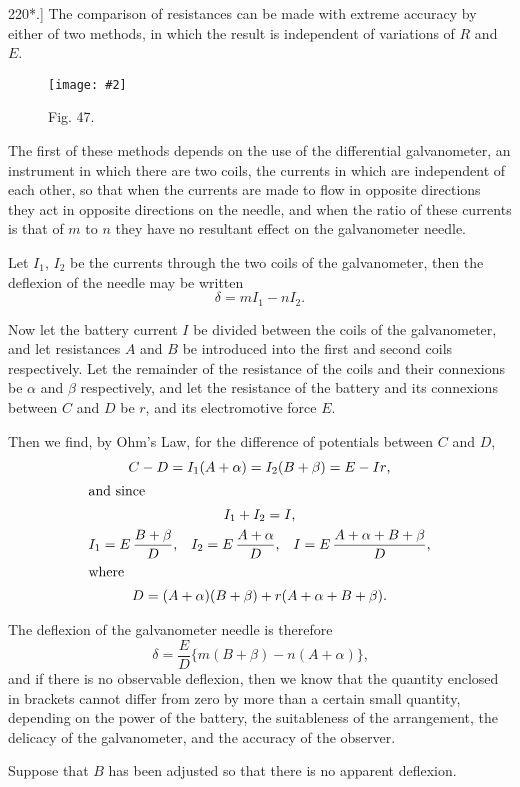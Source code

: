 \documentclass[12pt,oneside]{book}[2021/10/04]
\newcommand{\article}[1]{\phantomsection \label{art:#1}{#1.]}}
\newcommand{\widefig}[3]{
\begin{figure}[ht!]
\centering
\texttt{[image: \#2]}
\caption*{\small #3}
\end{figure}}
\newcommand{\¬}{\hphantom{0}}
\begin{document}
\article{220*} The comparison of resistances can be made with extreme
accuracy by either of two methods, in which the result is independent
of variations of \(R\) and \(E\).
\widefig{0.54}{200.png}{Fig. 47.}

The first of these methods depends on the use of the differential
galvanometer, an instrument in which there are two coils, the
currents in which are independent of each other, so that when
the currents are made to flow in opposite directions they act in
opposite directions on the needle, and when the ratio of these
currents is that of \(m\) to \(n\) they have no resultant effect on the
galvanometer needle.

Let \(I_1\), \(I_2\) be the currents through the two coils of the galvanometer,
then the deflexion of the needle may be written
\[
\delta = mI_1 - nI_2\text{.}
\]

Now let the battery current \(I\) be divided between the coils of
the galvanometer, and let resistances \(A\) and \(B\) be introduced into
the first and second coils respectively. Let the remainder of the
resistance of the coils and their connexions be \(\alpha\) and \(\beta\) respectively,
and let the resistance of the battery and its connexions
between \(C\) and \(D\) be \(r\), and its electromotive force \(E\).

Then we find, by Ohm's Law, for the difference of potentials
between \(C\) and \(D\),
\begin{gather*}
C-D = I_1(A+\alpha) = I_2(B+\beta) = E-Ir\text{,}\\
\shortintertext{and since}
I_1 + I_2 = I\text{,}\\
I_1 = E\,\frac {B + \beta}{D}\text{,}\quad I_2=E\,\frac{A+\alpha}{D}\text{,}\quad I = E\,\frac{A+\alpha+B+\beta}{D}\text{,}\\
\shortintertext{where}
D = (A + \alpha)(B + \beta) + r(A + \alpha + B + \beta)\text{.}
\end{gather*}

The deflexion of the galvanometer needle is therefore
\[
\delta =\frac{E}{D} \{m(B + \beta) - n(A + \alpha)\}\text{,}
\]
and if there is no observable deflexion, then we know that the
quantity enclosed in brackets cannot differ from zero by more than
a certain small quantity, depending on the power of the battery,
the suitableness of the arrangement, the delicacy of the galvanometer,
and the accuracy of the observer.

Suppose that \(B\) has been adjusted so that there is no apparent
deflexion.
\end{document}
